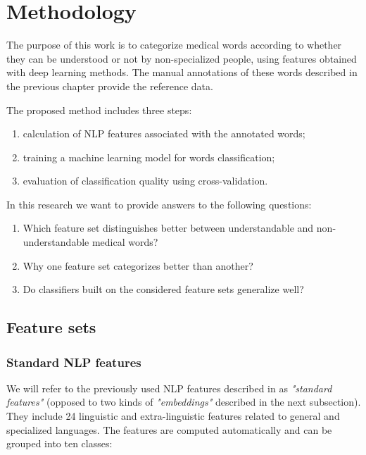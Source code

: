 \chapter{Methodology}
\label{ch:methodology}

The purpose of this work is to categorize medical words according to whether they can be understood or not by non-specialized people, using features obtained with deep learning methods. The manual annotations of these words described in the previous chapter provide the reference data. 


The proposed method includes three steps: 
\begin{enumerate}
    \item calculation of NLP features associated with the annotated words;
    \item training a machine learning model for words classification;
    \item evaluation of classification quality using cross-validation.
\end{enumerate}

In this research we want to provide answers to the following questions:
\begin{enumerate}
    \item Which feature set distinguishes better between understandable and non-understandable medical words?
    \item Why one feature set categorizes better than another?
    \item Do classifiers built on the considered feature sets generalize well? 
\end{enumerate}


\section{Feature sets}
\subsection{Standard NLP features}
\label{sec:standard-features}
We will refer to the previously used NLP features described in \citep{Grabar-PITR2014} as \textit{"standard features"} (opposed to two kinds of \textit{"embeddings"} described in the next subsection). They include 24 linguistic and extra-linguistic features related to general and specialized languages. The features are computed automatically and can be grouped into ten classes: 

